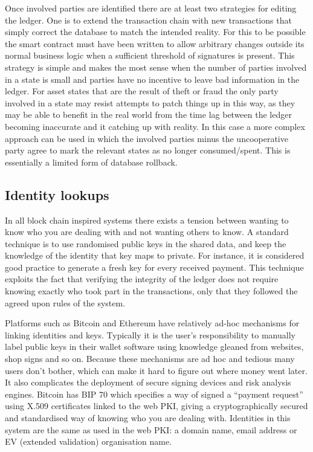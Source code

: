 \documentclass{article}
\begin{document}

Once involved parties are identified there are at least two strategies for editing the ledger. One is to extend
the transaction chain with new transactions that simply correct the database to match the intended reality. For
this to be possible the smart contract must have been written to allow arbitrary changes outside its normal
business logic when a sufficient threshold of signatures is present. This strategy is simple and makes the most
sense when the number of parties involved in a state is small and parties have no incentive to leave bad information
in the ledger. For asset states that are the result of theft or fraud the only party involved in a state may
resist attempts to patch things up in this way, as they may be able to benefit in the real world from the time
lag between the ledger becoming inaccurate and it catching up with reality. In this case a more complex approach
can be used in which the involved parties minus the uncooperative party agree to mark the relevant states as
no longer consumed/spent. This is essentially a limited form of database rollback.

\subsection{Identity lookups}\label{sec:identity-lookups}

In all block chain inspired systems there exists a tension between wanting to know who you are dealing with and
not wanting others to know. A standard technique is to use randomised public keys in the shared data, and keep
the knowledge of the identity that key maps to private. For instance, it is considered good practice to generate
a fresh key for every received payment. This technique exploits the fact that verifying the integrity of the ledger
does not require knowing exactly who took part in the transactions, only that they followed the agreed upon
rules of the system.

Platforms such as Bitcoin and Ethereum have relatively ad-hoc mechanisms for linking identities and keys. Typically
it is the user's responsibility to manually label public keys in their wallet software using knowledge gleaned from
websites, shop signs and so on. Because these mechanisms are ad hoc and tedious many users don't bother, which
can make it hard to figure out where money went later. It also complicates the deployment of secure signing devices
and risk analysis engines. Bitcoin has BIP 70\cite{BIP70} which specifies a way of signed a ``payment
request'' using X.509 certificates linked to the web PKI, giving a cryptographically secured and standardised way
of knowing who you are dealing with. Identities in this system are the same as used in the web PKI: a domain name,
email address or EV (extended validation) organisation name.
\end{document}
